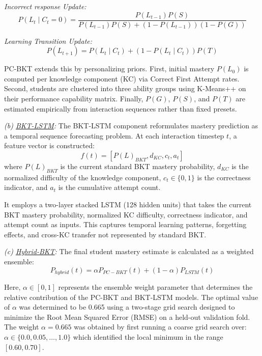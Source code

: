 \documentclass[conference]{IEEEtran}
\begin{document}
\textit{Incorrect response Update:}
{\small
\begin{equation}
P( L_t \mid C_t = 0 ) = \frac{P(L_{t-1})P(S)}{P(L_{t-1})P(S) + (1 - P(L_{t-1}))(1 - P(G))}
\end{equation}
}

\textit{Learning Transition Update:}
{\small
\begin{equation}
P(L_{t+1}) = P(L_t \mid C_t) + (1 - P(L_t \mid C_t))P(T)
\end{equation}
}

PC-BKT \cite{b10} extends this by personalizing priors. First, initial mastery $P(L_0)$ is computed per knowledge component (KC) via Correct First Attempt rates. Second, students are clustered into three ability groups using K-Means++ on their performance capability matrix. Finally, $P(G)$, $P(S)$, and $P(T)$ are estimated empirically from interaction sequences rather than fixed presets.

\textit{(b) \underline{BKT-LSTM}:} The BKT-LSTM component \cite{b11} reformulates mastery prediction as a temporal sequence forecasting problem. At each interaction timestep $t$, a feature vector is constructed:
{\small
\begin{equation}
f(t) = [P(L)_{BKT}, d_{KC}, c_t, a_t]
\end{equation}
}
where $P(L)_{BKT}$ is the current standard BKT mastery probability, $d_{KC}$ is the normalized difficulty of the knowledge component, $c_t \in \{0, 1\}$ is the correctness indicator, and $a_t$ is the cumulative attempt count. 

It employs a two-layer stacked LSTM (128 hidden units) that takes the current BKT mastery probability, normalized KC difficulty, correctness indicator, and attempt count as inputs. This captures temporal learning patterns, forgetting effects, and cross-KC transfer not represented by standard BKT.

\textit{(c) \underline{Hybrid-BKT}:} The final student mastery estimate is calculated as a weighted ensemble:
{\small
\begin{equation}
P_{hybrid}(t) = \alpha P_{PC-BKT}(t) + (1 - \alpha)P_{LSTM}(t)
\end{equation}
}

Here, $\alpha \in [0, 1]$ represents the ensemble weight parameter that determines the relative contribution of the PC-BKT and BKT-LSTM models. The optimal value of $\alpha$ was determined to be 0.665 using a two-stage grid search designed to minimize the Root Mean Squared Error (RMSE) on a held-out validation fold. The weight $\alpha = 0.665$ was obtained by first running a coarse grid search over: $\alpha \in \{0.0, 0.05, \dots, 1.0\}$ which identified the local minimum in the range $[0.60, 0.70]$.
\end{document}
